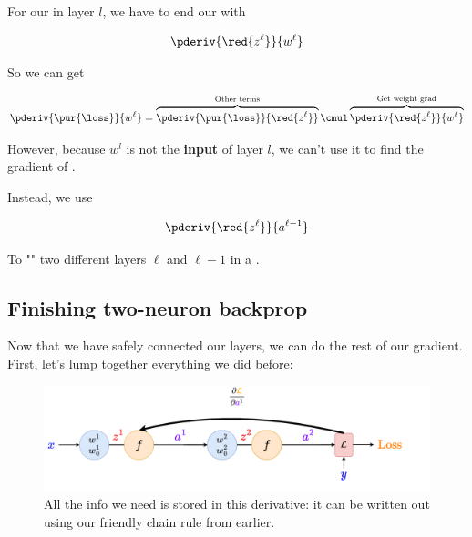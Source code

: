         \begin{concept}
            For our  in layer $l$, we have to end our  with
            
            \begin{equation*}
                \pderiv {\red{z^\ell}}   {w^\ell}
            \end{equation*}
            
            So we can get 
            
            \begin{equation*}
                \pderiv {\pur{\loss}} {w^\ell} 
                =
                \overbrace{
                    \pderiv {\pur{\loss}} {\red{z^\ell}} 
                }^{\text{Other terms} }
                \cmul  
                \overbrace{
                    \pderiv {\red{z^\ell}}   {w^\ell}
                }^{\text{Get weight grad}}
            \end{equation*}
            
            However, because $w^l$ is not the \textbf{input} of layer $l$, we can't use it to find the gradient of .
            
            Instead, we use 
            
            \begin{equation}
                \pderiv {\red{z^\ell}}   {a^{\ell-1}}
            \end{equation}
            
            To "" two different layers $\ell$ and $\ell-1$ in a .
        \end{concept}
        
            
    \secdiv
    
    \subsection{Finishing two-neuron backprop}
    
        Now that we have safely connected our layers, we can do the rest of our gradient. First, let's lump together everything we did before:
        
        \begin{figure}[H]
            \centering
            \includegraphics[width=120mm,scale=0.4]{images/nn_1_5_images/two_neurons_inside_bp4.png}
            \caption*{All the info we need is stored in this derivative: it can be written out using our friendly chain rule from earlier.}
        \end{figure}
        
